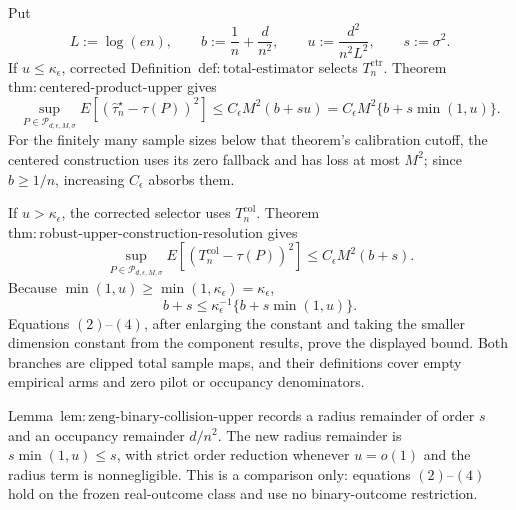 Put
\[
 L:=\log(en),\qquad b:=\frac1n+\frac d{n^2},\qquad
 u:=\frac{d^2}{n^2L^2},\qquad s:=\sigma^2.
\tag{1}
\]
If \(u\le\kappa_{\epsilon}\), corrected Definition~\(\mathrm{def:total\text{-}estimator}\) selects \(T_n^{\mathrm{ctr}}\).  Theorem~\(\mathrm{thm:centered\text{-}product\text{-}upper}\) gives
\[
 \sup_{P\in\mathcal P_{d,\epsilon,M,\sigma}}
 E[(\widehat\tau_n^{\star}-\tau(P))^2]
 \le C_{\epsilon}M^2(b+su)
 =C_{\epsilon}M^2\{b+s\min(1,u)\}.
\tag{2}
\]
For the finitely many sample sizes below that theorem's calibration cutoff, the centered construction uses its zero fallback and has loss at most \(M^2\); since \(b\ge1/n\), increasing \(C_{\epsilon}\) absorbs them.

If \(u>\kappa_{\epsilon}\), the corrected selector uses \(T_n^{\mathrm{col}}\).  Theorem~\(\mathrm{thm:robust\text{-}upper\text{-}construction\text{-}resolution}\) gives
\[
 \sup_{P\in\mathcal P_{d,\epsilon,M,\sigma}}
 E[(T_n^{\mathrm{col}}-\tau(P))^2]
 \le C_{\epsilon}M^2(b+s).
\tag{3}
\]
Because \(\min(1,u)\ge\min(1,\kappa_{\epsilon})=\kappa_{\epsilon}\),
\[
 b+s\le\kappa_{\epsilon}^{-1}\{b+s\min(1,u)\}.
\tag{4}
\]
Equations \((2)\)--\((4)\), after enlarging the constant and taking the smaller dimension constant from the component results, prove the displayed bound.  Both branches are clipped total sample maps, and their definitions cover empty empirical arms and zero pilot or occupancy denominators.

Lemma~\(\mathrm{lem:zeng\text{-}binary\text{-}collision\text{-}upper}\) records a radius remainder of order \(s\) and an occupancy remainder \(d/n^2\).  The new radius remainder is \(s\min(1,u)\le s\), with strict order reduction whenever \(u=o(1)\) and the radius term is nonnegligible.  This is a comparison only: equations \((2)\)--\((4)\) hold on the frozen real-outcome class and use no binary-outcome restriction.